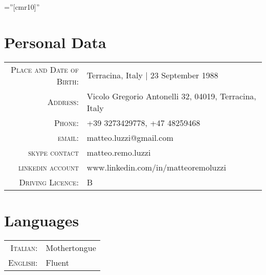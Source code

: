 \documentclass[a4paper,10pt]{article} %
\begin{document}
\pagestyle{empty} %

\font\fb=''[cmr10]'' %


\par{\bigskip\par} %

\section{Personal Data}

\begin{tabular}{rl}
\textsc{Place and Date of Birth:} & Terracina, Italy  | 23 September 1988 \\
\textsc{Address:} & Vicolo Gregorio Antonelli 32, 04019, Terracina, Italy \\
\textsc{Phone:} & +39 3273429778, +47 48259468\\
\textsc{email:} & {matteo.luzzi@gmail.com}\\
\textsc{skype contact} & {matteo.remo.luzzi}\\
\textsc{linkedin account} & {www.linkedin.com/in/matteoremoluzzi} \\
\textsc{Driving Licence}: & B\\
\end{tabular}



\section{Languages}

\begin{tabular}{rl}

\textsc{Italian:} & Mothertongue\\

\textsc{English:} & Fluent\\

\end{tabular}

\end{document}

